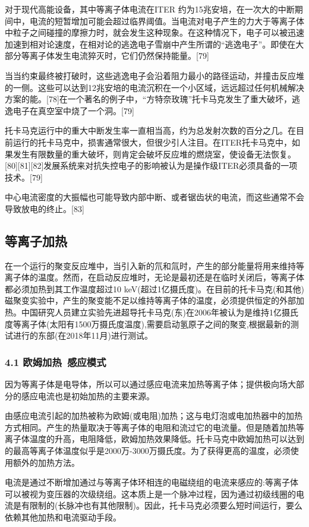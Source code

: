 对于现代高能设备，其中等离子体电流在ITER 约为15兆安培，在一次大的中断期间中，电流的短暂增加可能会超过临界阈值。当电流对电子产生的力大于等离子体中粒子之间碰撞的摩擦力时，就会发生这种现象。在这种情况下，电子可以被迅速加速到相对论速度，在相对论的逃逸电子雪崩中产生所谓的“逃逸电子”。即使在大部分等离子体发生电流猝灭时，它们仍然保持能量。[79]

当当约束最终被打破时，这些逃逸电子会沿着阻力最小的路径运动，并撞击反应堆的一侧。这些可以达到12兆安培的电流沉积在一个小区域，远远超过任何机械解决方案的能。[78]在一个著名的例子中，“方特奈玫瑰”托卡马克发生了重大破坏，逃逸电子在真空室中烧了一个洞。[79]

托卡马克运行中的重大中断发生率一直相当高，约为总发射次数的百分之几。在目前运行的托卡马克中，损害通常很大，但很少引人注目。在ITER托卡马克中，如果发生有限数量的重大破坏，则肯定会破坏反应堆的燃烧室，使设备无法恢复。[80][81][82]发展系统来对抗失控电子的影响被认为是操作级ITER必须具备的一项技术。[79]

中心电流密度的大振幅也可能导致内部中断、或者锯齿状的电流，而这些通常不会导致放电的终止。[83]

\subsection{等离子加热}
在一个运行的聚变反应堆中，当引入新的氘和氚时，产生的部分能量将用来维持等离子体的温度。然而，在启动反应堆时，无论是最初还是在临时关闭后，等离子体都必须加热到其工作温度超过10 keV(超过1亿摄氏度)。在目前的托卡马克(和其他)磁聚变实验中，产生的聚变能不足以维持等离子体的温度，必须提供恒定的外部加热。中国研究人员建立实验先进超导托卡马克(东)在2006年被认为是维持1亿摄氏度等离子体(太阳有1500万摄氏度温度),需要启动氢原子之间的聚变,根据最新的测试进行的东部(在2018年11月)进行测试。
\subsubsection{4.1 欧姆加热~感应模式}
因为等离子体是电导体，所以可以通过感应电流来加热等离子体；提供极向场大部分的感应电流也是初始加热的主要来源。

由感应电流引起的加热被称为欧姆(或电阻)加热；这与电灯泡或电加热器中的加热方式相同。产生的热量取决于等离子体的电阻和流过它的电流量。但是随着加热等离子体温度的升高，电阻降低，欧姆加热效果降低。托卡马克中欧姆加热可以达到的最高等离子体温度似乎是2000万-3000万摄氏度。为了获得更高的温度，必须使用额外的加热方法。

电流是通过不断增加通过与等离子体环相连的电磁绕组的电流来感应的:等离子体可以被视为变压器的次级绕组。这本质上是一个脉冲过程，因为通过初级线圈的电流是有限制的(长脉冲也有其他限制)。因此，托卡马克必须要么短时间运行，要么依赖其他加热和电流驱动手段。
